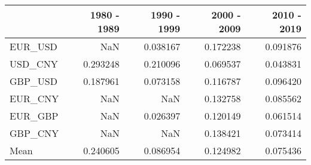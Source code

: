 \begin{tabular}{lrrrr}
\toprule
{} &  1980 - 1989 &  1990 - 1999 &  2000 - 2009 &  2010 - 2019 \\
\midrule
EUR\_USD &          NaN &     0.038167 &     0.172238 &     0.091876 \\
USD\_CNY &     0.293248 &     0.210096 &     0.069537 &     0.043831 \\
GBP\_USD &     0.187961 &     0.073158 &     0.116787 &     0.096420 \\
EUR\_CNY &          NaN &          NaN &     0.132758 &     0.085562 \\
EUR\_GBP &          NaN &     0.026397 &     0.120149 &     0.061514 \\
GBP\_CNY &          NaN &          NaN &     0.138421 &     0.073414 \\
Mean    &     0.240605 &     0.086954 &     0.124982 &     0.075436 \\
\bottomrule
\end{tabular}
